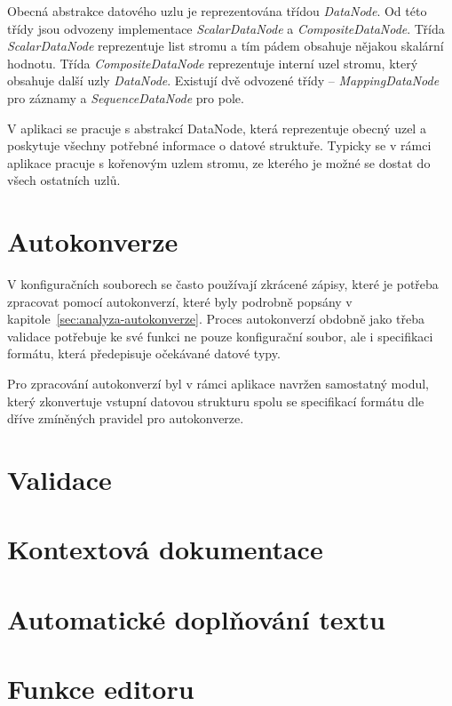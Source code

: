 \documentclass[FM,bw,DP]{tulthesis}
\begin{document}
Obecná abstrakce datového uzlu je reprezentována třídou \textit{DataNode}. Od této třídy jsou odvozeny implementace \textit{ScalarDataNode} a \textit{CompositeDataNode}. Třída \textit{ScalarDataNode} reprezentuje list stromu a tím pádem obsahuje nějakou skalární hodnotu. Třída \textit{CompositeDataNode} reprezentuje interní uzel stromu, který obsahuje další uzly \textit{DataNode}. Existují dvě odvozené třídy -- \textit{MappingDataNode} pro záznamy a \textit{SequenceDataNode} pro pole.

V aplikaci se pracuje s abstrakcí DataNode, která reprezentuje obecný uzel a poskytuje všechny potřebné informace o datové struktuře. Typicky se v rámci aplikace pracuje s kořenovým uzlem stromu, ze kterého je možné se dostat do všech ostatních uzlů.

\section{Autokonverze}

V konfiguračních souborech se často používají zkrácené zápisy, které je potřeba zpracovat pomocí autokonverzí, které byly podrobně popsány v kapitole~\ref{sec:analyza-autokonverze}. Proces autokonverzí obdobně jako třeba validace potřebuje ke své funkci ne pouze konfigurační soubor, ale i specifikaci formátu, která předepisuje očekávané datové typy.

Pro zpracování autokonverzí byl v rámci aplikace navržen samostatný modul, který zkonvertuje vstupní datovou strukturu spolu se specifikací formátu dle dříve zmíněných pravidel pro autokonverze. 




\section{Validace}

\section{Kontextová dokumentace}

\section{Automatické doplňování textu}

\section{Funkce editoru}
\end{document}
